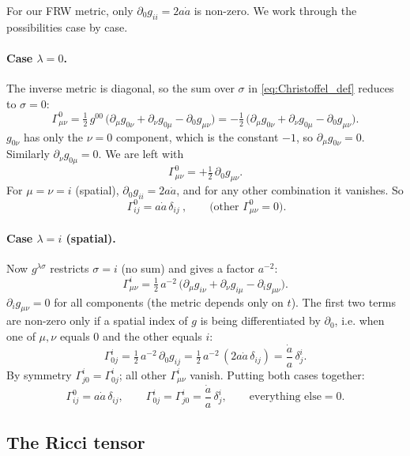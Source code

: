 For our FRW metric, only $\partial_0 g_{ii} = 2 a \dot{a}$ is non-zero. We work through the possibilities case by case.

\paragraph{Case $\lambda = 0$.} The inverse metric is diagonal, so the sum over $\sigma$ in \cref{eq:Christoffel_def} reduces to $\sigma = 0$:
\[
  \Gamma^0_{\mu\nu} = \tfrac{1}{2}\, g^{00}\, \bigl(\partial_\mu g_{0\nu} + \partial_\nu g_{0\mu} - \partial_0 g_{\mu\nu}\bigr) = -\tfrac{1}{2}\, \bigl(\partial_\mu g_{0\nu} + \partial_\nu g_{0\mu} - \partial_0 g_{\mu\nu}\bigr).
\]
$g_{0\nu}$ has only the $\nu = 0$ component, which is the constant $-1$, so $\partial_\mu g_{0\nu} = 0$. Similarly $\partial_\nu g_{0\mu} = 0$. We are left with
\[
  \Gamma^0_{\mu\nu} = +\tfrac{1}{2}\, \partial_0 g_{\mu\nu}.
\]
For $\mu = \nu = i$ (spatial), $\partial_0 g_{ii} = 2 a \dot{a}$, and for any other combination it vanishes. So
\begin{equation}
  \boxed{\ \Gamma^0_{ij} = a \dot{a}\, \delta_{ij}\ },
  \qquad \text{(other } \Gamma^0_{\mu\nu} = 0\text{)}.
\end{equation}

\paragraph{Case $\lambda = i$ (spatial).} Now $g^{\lambda\sigma}$ restricts $\sigma = i$ (no sum) and gives a factor $a^{-2}$:
\[
  \Gamma^i_{\mu\nu} = \tfrac{1}{2}\, a^{-2}\, \bigl(\partial_\mu g_{i\nu} + \partial_\nu g_{i\mu} - \partial_i g_{\mu\nu}\bigr).
\]
$\partial_i g_{\mu\nu} = 0$ for all components (the metric depends only on $t$). The first two terms are non-zero only if a spatial index of $g$ is being differentiated by $\partial_0$, i.e. when one of $\mu, \nu$ equals $0$ and the other equals $i$:
\[
  \Gamma^i_{0j} = \tfrac{1}{2}\, a^{-2}\, \partial_0 g_{ij} = \tfrac{1}{2}\, a^{-2}\, (2 a \dot{a}\, \delta_{ij}) = \frac{\dot a}{a}\, \delta^i_j.
\]
By symmetry $\Gamma^i_{j0} = \Gamma^i_{0j}$; all other $\Gamma^i_{\mu\nu}$ vanish. Putting both cases together:
\begin{equation}
  \Gamma^0_{ij} = a \dot{a}\, \delta_{ij},
  \qquad
  \Gamma^i_{0j} = \Gamma^i_{j0} = \frac{\dot a}{a}\, \delta^i_j,
  \qquad
  \text{everything else} = 0.
  \label{eq:Christoffels_FRW}
\end{equation}

\subsection{The Ricci tensor}

